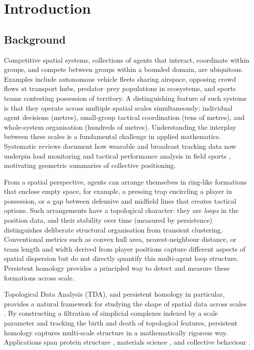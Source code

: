 \section{Introduction}
\label{sec:introduction}

\subsection{Background}

Competitive spatial systems, collections of agents that interact, coordinate within groups, and compete between groups within a bounded domain, are ubiquitous. Examples include autonomous vehicle fleets sharing airspace, opposing crowd flows at transport hubs, predator--prey populations in ecosystems, and sports teams contesting possession of territory. A distinguishing feature of such systems is that they operate across multiple spatial scales simultaneously: individual agent decisions (metres), small-group tactical coordination (tens of metres), and whole-system organisation (hundreds of metres). Understanding the interplay between these scales is a fundamental challenge in applied mathematics. Systematic reviews document how wearable and broadcast tracking data now underpin load monitoring and tactical performance analysis in field sports \citep{Cummins2013, Memmert2017}, motivating geometric summaries of collective positioning.

From a spatial perspective, agents can arrange themselves in ring-like formations that enclose empty space, for example, a pressing trap encircling a player in possession, or a gap between defensive and midfield lines that creates tactical options. Such arrangements have a topological character: they are \emph{loops} in the position data, and their stability over time (measured by persistence) distinguishes deliberate structural organisation from transient clustering. Conventional metrics such as convex hull area, nearest-neighbour distance, or team length and width derived from player positions \citep{Folgado2014} capture different aspects of spatial dispersion but do not directly quantify this multi-agent loop structure. Persistent homology provides a principled way to detect and measure these formations across scale.

Topological Data Analysis (TDA), and persistent homology in particular, provides a natural framework for studying the shape of spatial data across scales \citep{Edelsbrunner2010,Carlsson2009}. By constructing a filtration of simplicial complexes indexed by a scale parameter and tracking the birth and death of topological features, persistent homology captures multi-scale structure in a mathematically rigorous way. Applications span protein structure \citep{Xia2014}, materials science \citep{Hiraoka2016}, and collective behaviour \citep{Topaz2015}.

